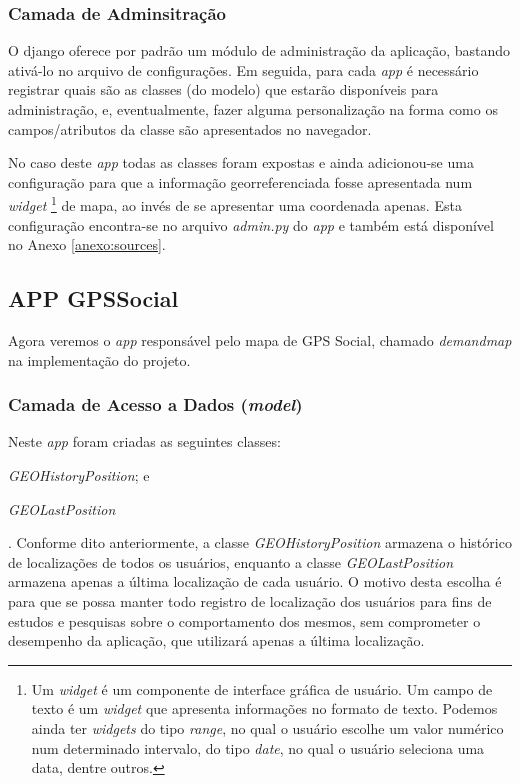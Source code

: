 \subsubsection{Camada de Adminsitração}
O \gls{django} oferece por padrão um módulo de administração da aplicação, bastando ativá-lo no arquivo de configurações. Em seguida, para cada \textit{app} é necessário registrar quais são as classes (do modelo) que estarão disponíveis para administração, e, eventualmente, fazer alguma personalização na forma como os campos/atributos da classe são apresentados no navegador.

No caso deste \textit{app} todas as classes foram expostas e ainda adicionou-se uma configuração para que a informação georreferenciada fosse apresentada num \textit{widget}%
\footnote{Um \textit{widget} é um componente de interface gráfica de usuário. Um campo de texto é um \textit{widget} que apresenta informações no formato de texto. Podemos ainda ter \textit{widgets} do tipo \textit{range}, no qual o usuário escolhe um valor numérico num determinado intervalo, do tipo \textit{date}, no qual o usuário seleciona uma data, dentre outros.}
de mapa, ao invés de se apresentar uma coordenada apenas. Esta configuração encontra-se no arquivo \textit{admin.py} do \textit{app} e também está disponível no Anexo \ref{anexo:sources}.

\subsection{APP GPSSocial}
Agora veremos o \textit{app} responsável pelo mapa de GPS Social, chamado \textit{demandmap} na implementação do projeto.

\subsubsection{Camada de Acesso a Dados (\textit{model})}\label{subsubsec:gps-camada-model}
Neste \textit{app} foram criadas as seguintes classes:
\begin{enumerate*}[label=\itshape\alph*\upshape)]
    \item \textit{GEOHistoryPosition}; e
    \item \textit{GEOLastPosition}
\end{enumerate*}.
Conforme dito anteriormente, a classe \textit{GEOHistoryPosition} armazena o histórico de localizações de todos os usuários, enquanto a classe \textit{GEOLastPosition} armazena apenas a última localização de cada usuário. O motivo desta escolha é para que se possa manter todo registro de localização dos usuários para fins de estudos e pesquisas sobre o comportamento dos mesmos, sem comprometer o desempenho da aplicação, que utilizará apenas a última localização.

